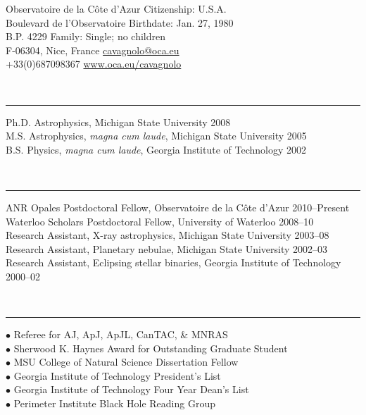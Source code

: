 \documentclass[12pt]{cv}
\begin{document}
\begin{center}
{\Large{}}\vspace{-0.3cm}
\end{center}
Observatoire de la C\^ote d'Azur \hfill Citizenship: U.S.A.\\
Boulevard de l'Observatoire \hfill Birthdate: Jan. 27\ths, 1980\\
B.P. 4229 \hfill Family: Single; no children\\
F-06304, Nice, France \hfill \href{mailto:cavagnolo@oca.eu}{cavagnolo@oca.eu}\\
+33(0)687098367 \hfill \href{http://www.oca.eu/~cavagnolo/}{www.oca.eu/cavagnolo}

{\large{}}\vspace{-0.3cm}\\
\rule{\linewidth}{0.5pt}
Ph.D. Astrophysics, Michigan State University \hfill 2008\\
M.S. Astrophysics, \textit{magna cum laude}, Michigan State University \hfill 2005\\
B.S. Physics, \textit{magna cum laude}, Georgia Institute of Technology \hfill 2002

{\large{}}\vspace{-0.3cm}\\
\rule{\linewidth}{0.5pt}
ANR Opales Postdoctoral Fellow, Observatoire de la C\^ote d'Azur \hfill 2010--Present\\
Waterloo Scholars Postdoctoral Fellow, University of Waterloo \hfill 2008--10\\
Research Assistant, X-ray astrophysics, Michigan State University \hfill 2003--08\\
Research Assistant, Planetary nebulae, Michigan State University \hfill 2002--03\\
Research Assistant, Eclipsing stellar binaries, Georgia Institute of Technology \hfill 2000--02

{\large{}}\vspace{-0.3cm}\\
\rule{\linewidth}{0.5pt}
{\scriptsize{$\bullet$}} Referee for AJ, ApJ, ApJL, CanTAC, \& MNRAS\\
{\scriptsize{$\bullet$}} Sherwood K. Haynes Award for Outstanding Graduate Student\\
{\scriptsize{$\bullet$}} MSU College of Natural Science Dissertation Fellow\\
{\scriptsize{$\bullet$}} Georgia Institute of Technology President's List\\
{\scriptsize{$\bullet$}} Georgia Institute of Technology Four Year Dean's List\\
{\scriptsize{$\bullet$}} Perimeter Institute Black Hole Reading Group
\end{document}
